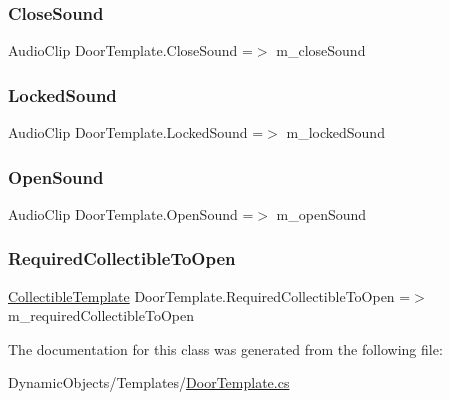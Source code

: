 \subsubsection{\texorpdfstring{Close\+Sound}{CloseSound}}
{\footnotesize\ttfamily Audio\+Clip Door\+Template.\+Close\+Sound =$>$ m\+\_\+close\+Sound}

\mbox{\label{class_door_template_a37860f0a0b18b910ac5b9521847d67b7}} 
\subsubsection{\texorpdfstring{Locked\+Sound}{LockedSound}}
{\footnotesize\ttfamily Audio\+Clip Door\+Template.\+Locked\+Sound =$>$ m\+\_\+locked\+Sound}

\mbox{\label{class_door_template_a0e5d35a1fd060d6b7708f4073b7c25b7}} 
\subsubsection{\texorpdfstring{Open\+Sound}{OpenSound}}
{\footnotesize\ttfamily Audio\+Clip Door\+Template.\+Open\+Sound =$>$ m\+\_\+open\+Sound}

\mbox{\label{class_door_template_a9d890cc94e93d64b7ebffc3074cf9dc4}} 
\subsubsection{\texorpdfstring{Required\+Collectible\+To\+Open}{RequiredCollectibleToOpen}}
{\footnotesize\ttfamily \mbox{\hyperlink{class_collectible_template}{Collectible\+Template}} Door\+Template.\+Required\+Collectible\+To\+Open =$>$ m\+\_\+required\+Collectible\+To\+Open}



The documentation for this class was generated from the following file\+:\begin{DoxyCompactItemize}
\item 
Dynamic\+Objects/\+Templates/\mbox{\hyperlink{_door_template_8cs}{Door\+Template.\+cs}}\end{DoxyCompactItemize}
